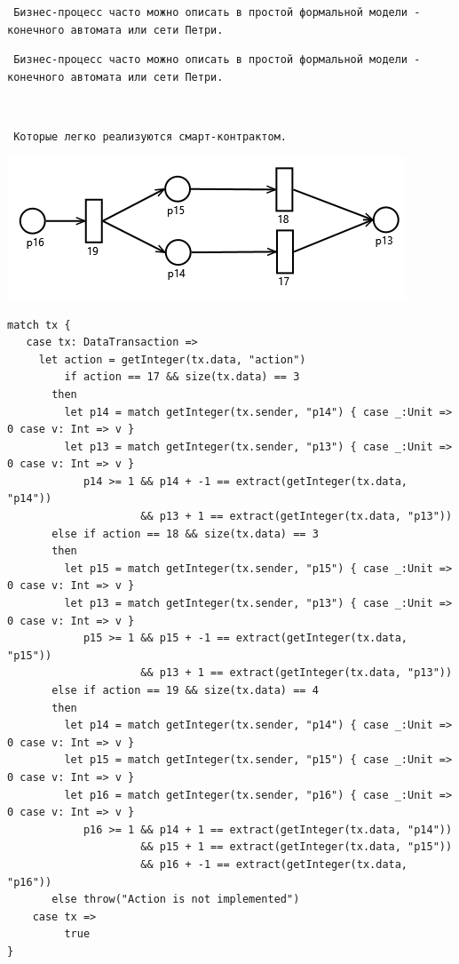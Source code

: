 \documentclass[11pt,handout,pdf,hyperref={unicode}]{beamer}
\begin{document}
\begin{frame}[fragile]

\texttt{ Бизнес-процесс часто можно описать в простой формальной модели - конечного автомата или сети Петри. }

\end{frame}

\begin{frame}[fragile]

\texttt{ Бизнес-процесс часто можно описать в простой формальной модели - конечного автомата или сети Петри. }

\texttt{ }

\texttt{ Которые легко реализуются смарт-контрактом. }

\end{frame}

\begin{frame}[fragile]
\includegraphics[scale=0.8]{petri_sample.png}

\end{frame}

\begin{frame}[fragile]

\begin{verbatim}
match tx {
   case tx: DataTransaction => 
     let action = getInteger(tx.data, "action")
         if action == 17 && size(tx.data) == 3
       then
         let p14 = match getInteger(tx.sender, "p14") { case _:Unit => 0 case v: Int => v }
         let p13 = match getInteger(tx.sender, "p13") { case _:Unit => 0 case v: Int => v }
            p14 >= 1 && p14 + -1 == extract(getInteger(tx.data, "p14"))
                     && p13 + 1 == extract(getInteger(tx.data, "p13"))
       else if action == 18 && size(tx.data) == 3
       then
         let p15 = match getInteger(tx.sender, "p15") { case _:Unit => 0 case v: Int => v }
         let p13 = match getInteger(tx.sender, "p13") { case _:Unit => 0 case v: Int => v }
            p15 >= 1 && p15 + -1 == extract(getInteger(tx.data, "p15"))
                     && p13 + 1 == extract(getInteger(tx.data, "p13"))
       else if action == 19 && size(tx.data) == 4
       then
         let p14 = match getInteger(tx.sender, "p14") { case _:Unit => 0 case v: Int => v }
         let p15 = match getInteger(tx.sender, "p15") { case _:Unit => 0 case v: Int => v }
         let p16 = match getInteger(tx.sender, "p16") { case _:Unit => 0 case v: Int => v }
            p16 >= 1 && p14 + 1 == extract(getInteger(tx.data, "p14"))
                     && p15 + 1 == extract(getInteger(tx.data, "p15"))
                     && p16 + -1 == extract(getInteger(tx.data, "p16"))
       else throw("Action is not implemented")
    case tx =>
         true
}
\end{verbatim}

\end{frame}
\end{document}

